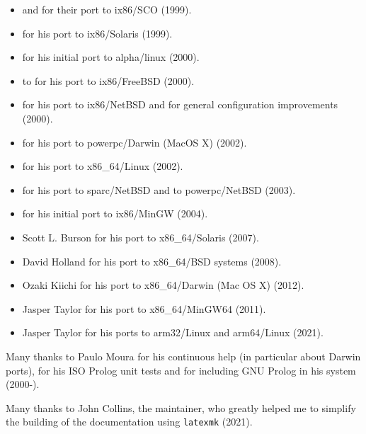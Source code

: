 \begin{itemize}

\item {} and
 for their port to
ix86/SCO (1999).

\item {} for
his port to ix86/Solaris (1999).

\item {} for his initial port to
alpha/linux (2000).

\item {} to for his port to
ix86/FreeBSD (2000).

\item {} for his port to
ix86/NetBSD and for general configuration improvements (2000).

\item {} for his port to
powerpc/Darwin (MacOS X) (2002).

\item {} for his port to
x86\_64/Linux (2002).

\item {} for his port to
sparc/NetBSD and to powerpc/NetBSD (2003).

\item {} for his initial port to
ix86/MinGW (2004).

\item {} {Scott L. Burson} for his port to x86\_64/Solaris (2007).

\item {} {David Holland} for his port to x86\_64/BSD systems (2008).

\item {} {Ozaki Kiichi} for his port to x86\_64/Darwin (Mac OS X) (2012).

\item {} {Jasper Taylor} for his port to x86\_64/MinGW64 (2011).

\item {} {Jasper Taylor} for his ports to arm32/Linux and arm64/Linux (2021).

\end{itemize}

Many thanks to Paulo Moura for his continuous help (in particular
about Darwin ports), for his ISO Prolog unit tests and for including
GNU Prolog in his  system (2000-).

Many thanks to John Collins, the 
maintainer, who greatly helped me to simplify the building of the documentation using
\texttt{latexmk} (2021).



